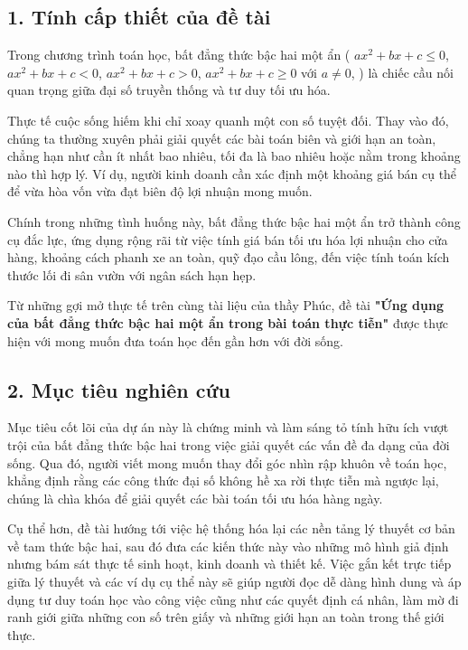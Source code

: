 \documentclass[14pt, a4paper, oneside]{extreport}
\begin{document}
\subsection*{1. Tính cấp thiết của đề tài}

Trong chương trình toán học, bất đẳng thức bậc hai một ẩn ( $ax^2 + bx + c \le 0$, $ax^2 + bx + c < 0$, $ax^2 + bx + c > 0$, $ax^2 + bx + c \ge 0$ với $a \neq 0$, ) là chiếc cầu nối quan trọng giữa đại số truyền thống và tư duy tối ưu hóa.

Thực tế cuộc sống hiếm khi chỉ xoay quanh một con số tuyệt đối. Thay vào đó, chúng ta thường xuyên phải giải quyết các bài toán biên và giới hạn an toàn, chẳng hạn như cần ít nhất bao nhiêu, tối đa là bao nhiêu hoặc nằm trong khoảng nào thì hợp lý. Ví dụ, người kinh doanh cần xác định một khoảng giá bán cụ thể để vừa hòa vốn vừa đạt biên độ lợi nhuận mong muốn.

Chính trong những tình huống này, bất đẳng thức bậc hai một ẩn trở thành công cụ đắc lực, ứng dụng rộng rãi từ việc tính giá bán tối ưu hóa lợi nhuận cho cửa hàng, khoảng cách phanh xe an toàn, quỹ đạo cầu lông, đến việc tính toán kích thước lối đi sân vườn với ngân sách hạn hẹp.

Từ những gợi mở thực tế trên cùng tài liệu của thầy Phúc, đề tài \textbf{"Ứng dụng của bất đẳng thức bậc hai một ẩn trong bài toán thực tiễn"} được thực hiện với mong muốn đưa toán học đến gần hơn với đời sống.

\subsection*{2. Mục tiêu nghiên cứu}
Mục tiêu cốt lõi của dự án này là chứng minh và làm sáng tỏ tính hữu ích vượt trội của bất đẳng thức bậc hai trong việc giải quyết các vấn đề đa dạng của đời sống. Qua đó, người viết mong muốn thay đổi góc nhìn rập khuôn về toán học, khẳng định rằng các công thức đại số không hề xa rời thực tiễn mà ngược lại, chúng là chìa khóa để giải quyết các bài toán tối ưu hóa hàng ngày.

Cụ thể hơn, đề tài hướng tới việc hệ thống hóa lại các nền tảng lý thuyết cơ bản về tam thức bậc hai, sau đó đưa các kiến thức này vào những mô hình giả định nhưng bám sát thực tế sinh hoạt, kinh doanh và thiết kế. Việc gắn kết trực tiếp giữa lý thuyết và các ví dụ cụ thể này sẽ giúp người đọc dễ dàng hình dung và áp dụng tư duy toán học vào công việc cũng như các quyết định cá nhân, làm mờ đi ranh giới giữa những con số trên giấy và những giới hạn an toàn trong thế giới thực.
\end{document}
